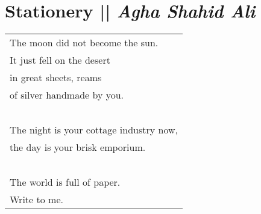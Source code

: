 \section[Stationery]{Stationery || \emph{Agha Shahid Ali} \hspace*{\fill}  \thepage}
\vspace*{3.25cm}
\begin{center}
\begin{tabular}{l}
The moon did not become the sun.\\
It just fell on the desert\\
in great sheets, reams\\
of silver handmade by you.\\

\-\ \\The night is your cottage industry now,\\
the day is your brisk emporium.\\

\-\ \\The world is full of paper.\\
Write to me.
\end{tabular}
\end{center}